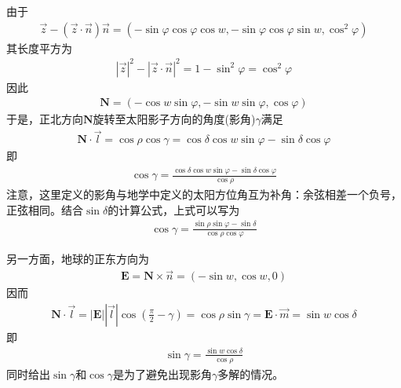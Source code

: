             由于
            \begin{align*}
            \vec{z} - (\vec{z}\cdot\vec{n})\vec{n} = (-\sin\varphi\cos\varphi\cos w,-\sin\varphi\cos\varphi\sin w,\cos^2\varphi)
            \end{align*}
            其长度平方为
            \begin{align*}
            |\vec{z}|^2 - |\vec{z}\cdot\vec{n}|^2 = 1-\sin^2\varphi = \cos^2\varphi
            \end{align*}
            因此
            \begin{align*}
            \mathbf{N} = (-\cos w\sin\varphi,-\sin w\sin\varphi,\cos\varphi)
            \end{align*}
            于是，正北方向$\mathbf{N}$旋转至太阳影子方向的角度(影角)$\gamma$满足
            \begin{align*}
            \mathbf{N}\cdot\vec{l} = \cos\rho\cos \gamma = \cos\delta\cos w\sin\varphi - \sin\delta\cos \varphi
            \end{align*}
            即
            \begin{align*}
            \cos \gamma = \frac{\cos\delta\cos w\sin\varphi - \sin\delta\cos \varphi}{\cos\rho}
            \end{align*}
            注意，这里定义的影角与地学中定义的太阳方位角互为补角：余弦相差一个负号，正弦相同。结合$\sin\delta$的计算公式，上式可以写为
            \begin{align*}
            \cos\gamma = \frac{\sin\rho\sin\varphi - \sin\delta}{\cos\rho\cos\varphi}
            \end{align*}
            \par
            另一方面，地球的正东方向为
            \begin{align*}
            \mathbf{E} = \mathbf{N}\times \vec{n}=(-\sin w,\cos w,0)
            \end{align*}
            因而
            \begin{align*}
            \mathbf{N}\cdot \vec{l} = |\mathbf{E}||\vec{l}|\cos (\frac{\pi}{2} - \gamma) = \cos\rho\sin \gamma = \mathbf{E}\cdot\vec{m} = \sin w\cos\delta
            \end{align*}
            即
            \begin{align*}
            \sin \gamma = \frac{\sin w\cos\delta}{\cos\rho}
            \end{align*}
            同时给出$\sin \gamma$和$\cos\gamma$是为了避免出现影角$\gamma$多解的情况。
            \par
